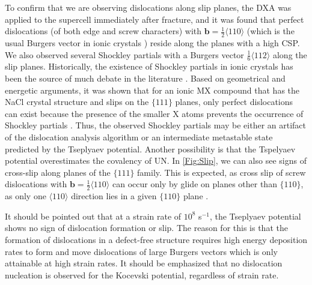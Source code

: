 \documentclass[applsci,article,submit,pdftex,moreauthors]{Definitions/mdpi}
\newcommand{\?}{\stackrel{?}{=}}
\begin{document}
To confirm that we are observing dislocations along slip planes, the DXA was applied to the supercell immediately after fracture, and it was found that perfect dislocations (of both edge and screw characters) with $\mathbf{b} = \frac{1}{2} \langle 110 \rangle$ (which is the usual Burgers vector in ionic crystals \cite{Hull2011}) reside along the planes with a high CSP. We also observed several Shockley partials with a Burgers vector $\frac{1}{6}\langle112\rangle$ along the slip planes. Historically, the existence of Shockley partials in ionic crystals has been the source of much debate in the literature \cite{Smoluchowski1966, Haasen1985}. Based on geometrical and energetic arguments, it was shown that for an ionic MX compound that has the NaCl crystal structure and slips on the $\{111\}$ planes, only perfect dislocations can exist because the presence of the smaller X atoms prevents the occurrence of Shockley partials \cite{VanDerWalt1967}. Thus, the observed Shockley partials may be either an artifact of the dislocation analysis algorithm or an intermediate metastable state predicted by the Tseplyaev potential. Another possibility is that the Tspelyaev potential overestimates the covalency of UN. In \cref{Fig:Slip}, we can also see signs of cross-slip along planes of the $\{111\}$ family. This is expected, as cross slip of screw dislocations with $\mathbf{b} = \frac{1}{2}\langle110\rangle$ can occur only by glide on planes other than $\{110\}$, as only one $\langle110\rangle$ direction lies in a given $\{110\}$ plane \cite{Hull2011}.

It should be pointed out that at a strain rate of $10^{8}$ s$^{-1}$, the Tseplyaev potential shows no sign of dislocation formation or slip. The reason for this is that the formation of dislocations in a defect-free structure requires high energy deposition rates to form and move dislocations of large Burgers vectors \cite{Desai2008, Pal2020} which is only attainable at high strain rates. It should be emphasized that no dislocation nucleation is observed for the Kocevski potential, regardless of strain rate.
\end{document}
